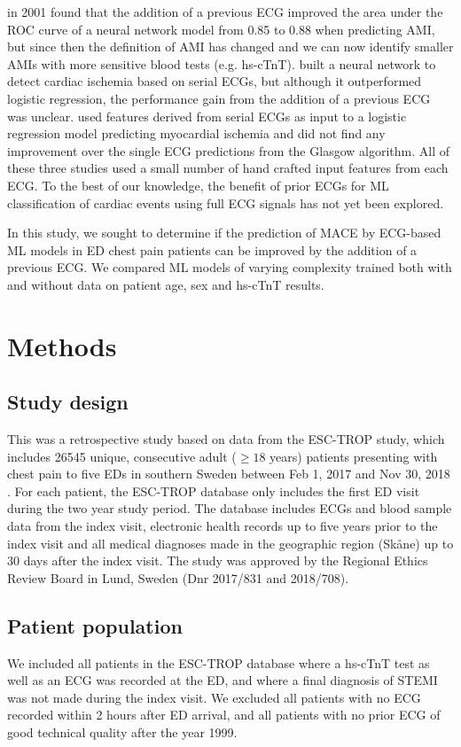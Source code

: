 \documentclass[preprint]{elsarticle}
\begin{document}
\citet{ohlsson2001} in 2001 found that the addition of a previous ECG improved the area under the ROC curve of a neural network model from 0.85 to 0.88 when predicting AMI, but since then the definition of AMI has changed and we can now identify smaller AMIs with more sensitive blood tests (e.g. hs-cTnT). \citet{sbrollini2019} built a neural network to detect cardiac ischemia based on serial ECGs, but although it outperformed logistic regression, the performance gain from the addition of a previous ECG was unclear. \citet{terhaar2019} used features derived from serial ECGs as input to a logistic regression model predicting myocardial ischemia and did not find any improvement over the single ECG predictions from the Glasgow algorithm. All of these three studies used a small number of hand crafted input features from each ECG. To the best of our knowledge, the benefit of prior ECGs for ML classification of cardiac events using full ECG signals has not yet been explored.

In this study, we sought to determine if the prediction of MACE by ECG-based ML models in ED chest pain patients can be improved by the addition of a previous ECG. We compared ML models of varying complexity trained both with and without data on patient age, sex and hs-cTnT results.

\section{Methods}
\subsection{Study design}
This was a retrospective study based on data from the ESC-TROP study, which includes 26545 unique, consecutive adult ($\geq 18$ years) patients presenting with chest pain to five EDs in southern Sweden between Feb 1, 2017 and Nov 30, 2018 \citep{mokhtari2020}. For each patient, the ESC-TROP database only includes the first ED visit during the two year study period. The database includes ECGs and blood sample data from the index visit, electronic health records up to five years prior to the index visit and all medical diagnoses made in the geographic region (Sk\aa{}ne) up to 30 days after the index visit. The study was approved by the Regional Ethics Review Board in Lund, Sweden (Dnr 2017/831 and 2018/708). 
\subsection{Patient population}
We included all patients in the ESC-TROP database where a hs-cTnT test as well as an ECG was recorded at the ED, and where a final diagnosis of STEMI was not made during the index visit. We excluded all patients with no ECG recorded within 2 hours after ED arrival, and all patients with no prior ECG of good technical quality after the year 1999.
\end{document}
